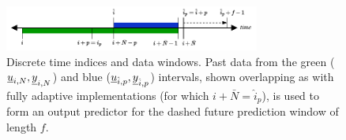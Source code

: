 \begin{figure}[b!]
	\centering
	\includegraphics[width=8.4cm]{docs/manuscript/figures/intervals_DeePC.pdf}%
	\caption{Discrete time indices and data windows. Past data from the green ($\underline{u}_{i,\relax{N}},\underline{y}_{i,\relax{N}}$) and blue ($\underline{u}_{\hat{i},p},\underline{y}_{\hat{i},p}$) intervals, shown overlapping as with fully adaptive implementations (for which $i+\bar{N}=\hat{i}_p$), is used to form an output predictor for the dashed future prediction window of length $f$.}
	\label{fig:intervals_DeePC}
\end{figure}
%

